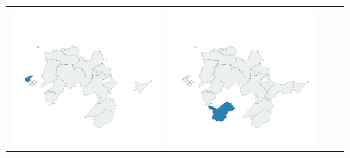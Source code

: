 \begin{figure}[p]
\begin{tabularx}{1\textwidth}{XXXX}
\includegraphics[width=1\linewidth]{images/ch6/loading/11}&
\includegraphics[width=1\linewidth]{images/ch6/loading/12} \\

\end{tabularx}
\end{figure}
